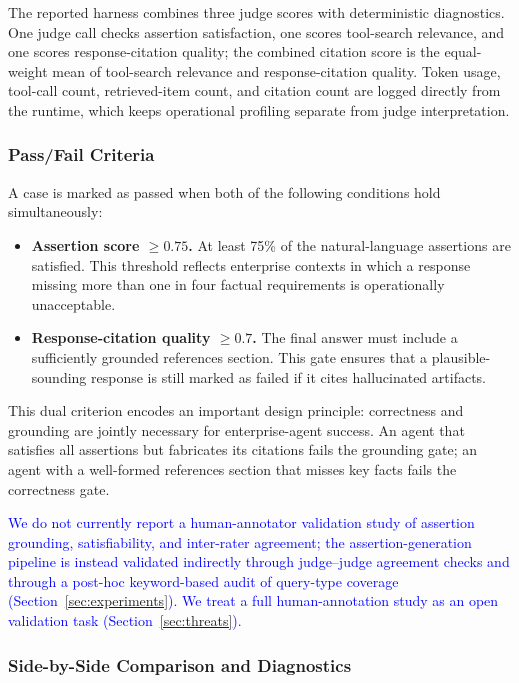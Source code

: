 The reported harness combines three judge scores with deterministic diagnostics. One judge call checks assertion satisfaction, one scores tool-search relevance, and one scores response-citation quality; the combined citation score is the equal-weight mean of tool-search relevance and response-citation quality. Token usage, tool-call count, retrieved-item count, and citation count are logged directly from the runtime, which keeps operational profiling separate from judge interpretation.

\subsubsection{Pass/Fail Criteria}

A case is marked as passed when both of the following conditions hold simultaneously:
\begin{itemize}[leftmargin=*,itemsep=2pt,topsep=4pt]
  \item \textbf{Assertion score $\geq 0.75$.} At least 75\% of the natural-language assertions are satisfied. This threshold reflects enterprise contexts in which a response missing more than one in four factual requirements is operationally unacceptable.
  \item \textbf{Response-citation quality $\geq 0.7$.} The final answer must include a sufficiently grounded references section. This gate ensures that a plausible-sounding response is still marked as failed if it cites hallucinated artifacts.
\end{itemize}
This dual criterion encodes an important design principle: correctness and grounding are jointly necessary for enterprise-agent success. An agent that satisfies all assertions but fabricates its citations fails the grounding gate; an agent with a well-formed references section that misses key facts fails the correctness gate.

\textcolor{blue}{We do not currently report a human-annotator validation study of assertion grounding, satisfiability, and inter-rater agreement; the assertion-generation pipeline is instead validated indirectly through judge--judge agreement checks and through a post-hoc keyword-based audit of query-type coverage (Section~\ref{sec:experiments}). We treat a full human-annotation study as an open validation task (Section~\ref{sec:threats}).}

\subsubsection{Side-by-Side Comparison and Diagnostics}

